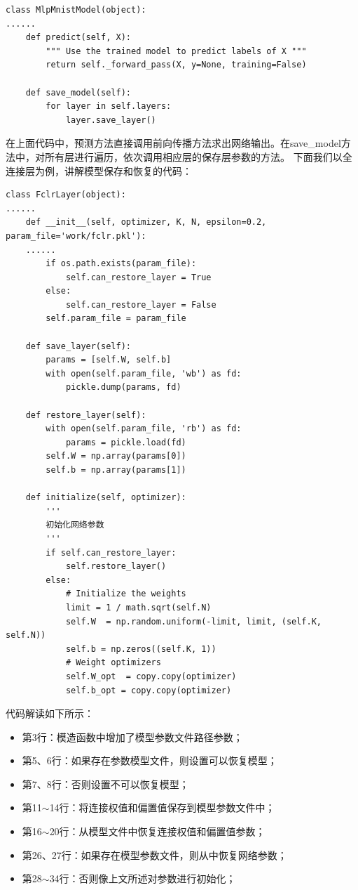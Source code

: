 \documentclass[UTF8]{article}
\begin{document}
\begin{lstlisting}
class MlpMnistModel(object):
......
    def predict(self, X):
        """ Use the trained model to predict labels of X """
        return self._forward_pass(X, y=None, training=False)

    def save_model(self):
        for layer in self.layers:
            layer.save_layer()
\end{lstlisting}
在上面代码中，预测方法直接调用前向传播方法求出网络输出。在save\_model方法中，对所有层进行遍历，依次调用相应层的保存层参数的方法。
下面我们以全连接层为例，讲解模型保存和恢复的代码：
\begin{lstlisting}
class FclrLayer(object):
......
    def __init__(self, optimizer, K, N, epsilon=0.2, param_file='work/fclr.pkl'):
    ......
        if os.path.exists(param_file):
            self.can_restore_layer = True
        else:
            self.can_restore_layer = False
        self.param_file = param_file

    def save_layer(self):
        params = [self.W, self.b]
        with open(self.param_file, 'wb') as fd:
            pickle.dump(params, fd)

    def restore_layer(self):
        with open(self.param_file, 'rb') as fd:
            params = pickle.load(fd)
        self.W = np.array(params[0])
        self.b = np.array(params[1])

    def initialize(self, optimizer):
        '''
        初始化网络参数
        '''
        if self.can_restore_layer:
            self.restore_layer()
        else:
            # Initialize the weights
            limit = 1 / math.sqrt(self.N)
            self.W  = np.random.uniform(-limit, limit, (self.K, self.N))
            self.b = np.zeros((self.K, 1))
            # Weight optimizers
            self.W_opt  = copy.copy(optimizer)
            self.b_opt = copy.copy(optimizer)
\end{lstlisting}
代码解读如下所示：
\begin{itemize}
\item 第3行：模造函数中增加了模型参数文件路径参数；
\item 第5、6行：如果存在参数模型文件，则设置可以恢复模型；
\item 第7、8行：否则设置不可以恢复模型；
\item 第11$\sim$14行：将连接权值和偏置值保存到模型参数文件中；
\item 第16$\sim$20行：从模型文件中恢复连接权值和偏置值参数；
\item 第26、27行：如果存在模型参数文件，则从中恢复网络参数；
\item 第28$\sim$34行：否则像上文所述对参数进行初始化；
\end{itemize}
\end{document}
